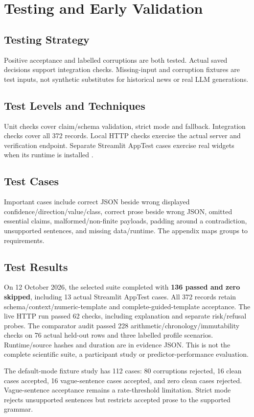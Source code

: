 \chapter{Testing and Early Validation}
\section{Testing Strategy}
Positive acceptance and labelled corruptions are both tested. Actual saved decisions support integration checks. Missing-input and corruption fixtures are test inputs, not synthetic substitutes for historical news or real LLM generations.
\section{Test Levels and Techniques}
Unit checks cover claim/schema validation, strict mode and fallback. Integration checks cover all 372 records. Local HTTP checks exercise the actual server and verification endpoint. Separate Streamlit AppTest cases exercise real widgets when its runtime is installed \cite{streamlit_apptest}.
\section{Test Cases}
Important cases include correct JSON beside wrong displayed confidence/direction/value/class, correct prose beside wrong JSON, omitted essential claims, malformed/non-finite payloads, padding around a contradiction, unsupported sentences, and missing data/runtime. The appendix maps groups to requirements.
\section{Test Results}
On 12 October 2026, the selected suite completed with \textbf{136 passed and zero skipped}, including 13 actual Streamlit AppTest cases. All 372 records retain schema/context/numeric-template and complete-guided-template acceptance. The live HTTP run passed 62 checks, including explanation and separate risk/refusal probes. The comparator audit passed 228 arithmetic/chronology/immutability checks on 76 actual held-out rows and three labelled profile scenarios. Runtime/source hashes and duration are in evidence JSON. This is not the complete scientific suite, a participant study or predictor-performance evaluation.

The default-mode fixture study has 112 cases: 80 corruptions rejected, 16 clean cases accepted, 16 vague-sentence cases accepted, and zero clean cases rejected. Vague-sentence acceptance remains a rate-threshold limitation. Strict mode rejects unsupported sentences but restricts accepted prose to the supported grammar.
